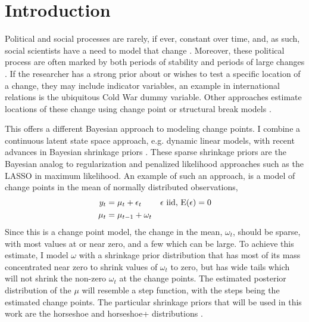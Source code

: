 
\newcommand{\ModelII}[1]{\texttt{#1}}


\section{Introduction}
\label{dlm:sec:introduction}

Political and social processes are rarely, if ever, constant over time, and, as such, social scientists have a need to model that change \parencites{Buethe2002a}{Lieberman2002a}.
Moreover, these political process are often marked by both periods of stability and periods of large changes \parencites{Pierson2004}.
If the researcher has a strong prior about or wishes to test a specific location of a change, they may include indicator variables, an example in international relations is the ubiquitous Cold War dummy variable.
Other approaches estimate locations of these change using change point or structural break models \parencites{CalderiaZorn1998}{WesternKleykamp2004}{Spirling2007a}{Spirling2007b}{Park2010}{Park2011}{Blackwell2012}.

This offers a different Bayesian approach to modeling change points.
I combine a continuous latent state space approach, e.g. dynamic linear models, with recent advances in Bayesian shrinkage priors \parencites{CarvalhoPolsonScott2009}{CarvalhoPolsonScott2010}{PolsonScott2010}.
These sparse shrinkage priors are the Bayesian analog to regularization and penalized likelihood approaches such as the LASSO \parencites{Tibshirani1996} in maximum likelihood.
An example of such an approach, is a model of change points in the mean of normally distributed observations,
\begin{equation}
  \label{dlm:eq:31}
  \begin{aligned}[t]
  y_{t} &= \mu_{t} + \epsilon_{t} & \text{$\epsilon$ iid, $\operatorname{E}(\epsilon) = 0$} \\
  \mu_{t} &= \mu_{t - 1} + \omega_{t}
  \end{aligned}
\end{equation}
Since this is a change point model, the change in the mean, $\omega_{t}$, should be sparse, with most values at or near zero, and a few which can be large. 
To achieve this estimate, I model $\omega$ with a shrinkage prior distribution that has most of its mass concentrated near zero to shrink values of $\omega_{t}$ to zero, but has wide tails which will not shrink the non-zero $\omega_{t}$ at the change points.
The estimated posterior distribution of the $\mu$ will resemble a step function, with the steps being the estimated change points.
The particular shrinkage priors that will be used in this work are the horseshoe \parencites{CarvalhoPolsonScott2009}{CarvalhoPolsonScott2010} and horseshoe+ distributions \parencite{BhadraDattaPolsonEtAl2015a}.

